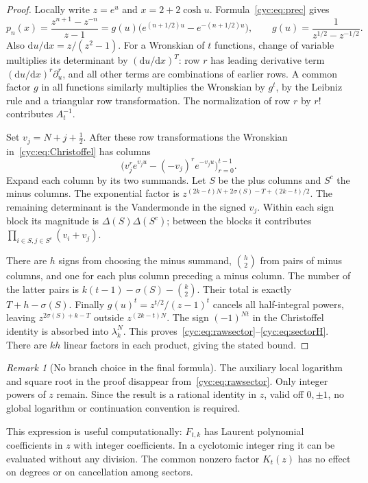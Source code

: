 \documentclass[11pt,a4paper]{article}
\numberwithin{equation}{section}
\theoremstyle{definition}
\theoremstyle{remark}
\newtheorem{remark}[theorem]{Remark}
\newcommand{\dd}{\mathrm d}
\begin{document}
\begin{proof}
Locally write $z=e^u$ and $x=2+2\cosh u$.  Formula~\eqref{cyc:eq:prec} gives
\begin{equation}\label{cyc:eq:pexp}
 p_n(x)=\frac{z^{n+1}-z^{-n}}{z-1}
 =g(u)\bigl(e^{(n+1/2)u}-e^{-(n+1/2)u}\bigr),\qquad
 g(u)=\frac1{z^{1/2}-z^{-1/2}}.
\end{equation}
Also $\dd u/\dd x=z/(z^2-1)$.  For a Wronskian of $t$ functions,
change of variable multiplies its determinant by $(\dd u/\dd x)^T$:
row $r$ has leading derivative term $(\dd u/\dd x)^r\partial_u^r$,
and all other terms are combinations of earlier rows.  A common
factor $g$ in all functions similarly multiplies the Wronskian by
$g^t$, by the Leibniz rule and a triangular row transformation.
The normalization of row $r$ by $r!$ contributes $A_t^{-1}$.

Set $v_j=N+j+\tfrac12$.  After these row transformations the
Wronskian in~\eqref{cyc:eq:Christoffel} has columns
\[
 \bigl(v_j^r e^{v_ju}-(-v_j)^r e^{-v_ju}\bigr)_{r=0}^{t-1}.
\]
Expand each column by its two summands.  Let $S$ be the plus columns
and $S^c$ the minus columns.  The exponential factor is
$z^{(2k-t)N+2\sigma(S)-T+(2k-t)/2}$.
The remaining determinant is the Vandermonde in the signed $v_j$.
Within each sign block its magnitude is $\Delta(S)\Delta(S^c)$;
between the blocks it contributes
$\prod_{i\in S,j\in S^c}(v_i+v_j)$.

There are $h$ signs from choosing the minus summand, $\binom h2$
from pairs of minus columns, and one for each plus column preceding a
minus column.  The number of the latter pairs is
$k(t-1)-\sigma(S)-\binom k2$.  Their total is exactly
$T+h-\sigma(S)$.  Finally $g(u)^t=z^{t/2}/(z-1)^t$ cancels all
half-integral powers, leaving $z^{2\sigma(S)+k-T}$ outside
$z^{(2k-t)N}$.  The sign $(-1)^{Nt}$ in the Christoffel identity
is absorbed into $\lambda_k^N$.
This proves~\eqref{cyc:eq:rawsector}--\eqref{cyc:eq:sectorH}.
There are $kh$ linear factors in each product, giving the stated bound.
\end{proof}

\begin{remark}[No branch choice in the final formula]
The auxiliary local logarithm and square root in the proof disappear
from~\eqref{cyc:eq:rawsector}.  Only integer powers of $z$ remain.
Since the result is a rational identity in $z$, valid off $0,\pm1$,
no global logarithm or continuation convention is required.
\end{remark}

This expression is useful computationally: $F_{t,k}$ has Laurent
polynomial coefficients in $z$ with integer coefficients.  In a
cyclotomic integer ring it can be evaluated without any division.
The common nonzero factor $K_t(z)$ has no effect on degrees or on
cancellation among sectors.
\end{document}
